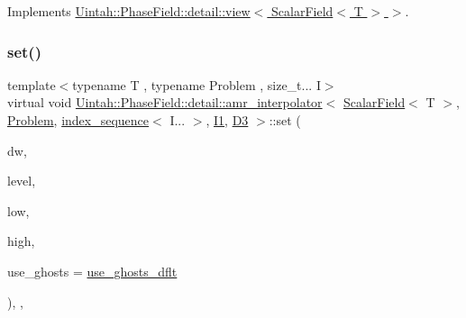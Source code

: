 Implements \hyperlink{classUintah_1_1PhaseField_1_1detail_1_1view_3_01ScalarField_3_01T_01_4_01_4_ae90ea8b33fde8515a1f2e8f5c03c0166}{Uintah\+::\+Phase\+Field\+::detail\+::view$<$ Scalar\+Field$<$ T $>$ $>$}.

\mbox{\label{classUintah_1_1PhaseField_1_1detail_1_1amr__interpolator_3_01ScalarField_3_01T_01_4_00_01Problemdf68628a6010a1e1526666730125c372_af36ec266ac99db41c8d9addb98999112}} 
\subsubsection{\texorpdfstring{set()}{set()}\hspace{0.1cm}{\footnotesize\ttfamily [2/2]}}
{\footnotesize\ttfamily template$<$typename T , typename Problem , size\+\_\+t... I$>$ \\
virtual void \hyperlink{classUintah_1_1PhaseField_1_1detail_1_1amr__interpolator}{Uintah\+::\+Phase\+Field\+::detail\+::amr\+\_\+interpolator}$<$ \hyperlink{structUintah_1_1PhaseField_1_1ScalarField}{Scalar\+Field}$<$ T $>$, \hyperlink{classUintah_1_1PhaseField_1_1Problem}{Problem}, \hyperlink{namespaceUintah_1_1PhaseField_a237de804d99512e50613aff7c94a9461}{index\+\_\+sequence}$<$ I... $>$, \hyperlink{namespaceUintah_1_1PhaseField_a547ce3002aa97fbd3ef3192a6eec8406a66f19efe774b0d2b6e5844eb2d83d305}{I1}, \hyperlink{namespaceUintah_1_1PhaseField_a12bfc68444894dffdf0cb8d9cf0cc76aa72fd61934c7ca788c49ad90629f76e78}{D3} $>$\+::set (\begin{DoxyParamCaption}\item[{Data\+Warehouse $\ast$}]{dw,  }\item[{const Level $\ast$}]{level,  }\item[{const Int\+Vector \&}]{low,  }\item[{const Int\+Vector \&}]{high,  }\item[{bool}]{use\+\_\+ghosts = {\ttfamily \hyperlink{classUintah_1_1PhaseField_1_1detail_1_1amr__interpolator_3_01ScalarField_3_01T_01_4_00_01Problemdf68628a6010a1e1526666730125c372_ac8949b5e1e12de5843d579bed1556ddb}{use\+\_\+ghosts\+\_\+dflt}} }\end{DoxyParamCaption})\hspace{0.3cm}{\ttfamily [inline]}, {\ttfamily [override]}, {\ttfamily [virtual]}}



